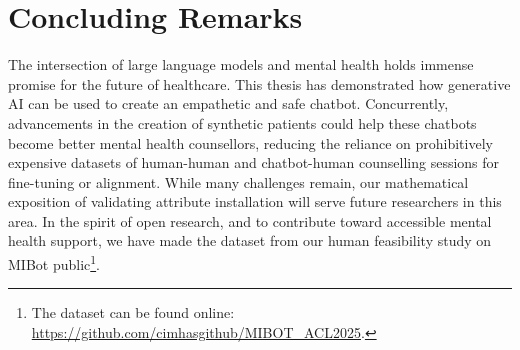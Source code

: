 \section{Concluding Remarks}

The intersection of large language models and mental health holds immense promise for the future of healthcare. This thesis has demonstrated how generative AI can be used to create an empathetic and safe chatbot. Concurrently, advancements in the creation of synthetic patients could help these chatbots become better mental health counsellors, reducing the reliance on prohibitively expensive datasets of human-human and chatbot-human counselling sessions for fine-tuning or alignment. While many challenges remain, our mathematical exposition of validating attribute installation will serve future researchers in this area. In the spirit of open research, and to contribute toward accessible mental health support, we have made the dataset from our human feasibility study on MIBot public\footnote{The dataset can be found online: \url{https://github.com/cimhasgithub/MIBOT\_ACL2025}.}.
